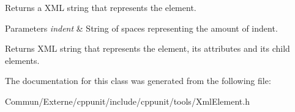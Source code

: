Returns a X\+ML string that represents the element. 


\begin{DoxyParams}{Parameters}
{\em indent} & String of spaces representing the amount of \textquotesingle{}indent\textquotesingle{}. \\
\hline
\end{DoxyParams}
\begin{DoxyReturn}{Returns}
X\+ML string that represents the element, its attributes and its child elements. 
\end{DoxyReturn}


The documentation for this class was generated from the following file\+:\begin{DoxyCompactItemize}
\item 
Commun/\+Externe/cppunit/include/cppunit/tools/Xml\+Element.\+h\end{DoxyCompactItemize}
